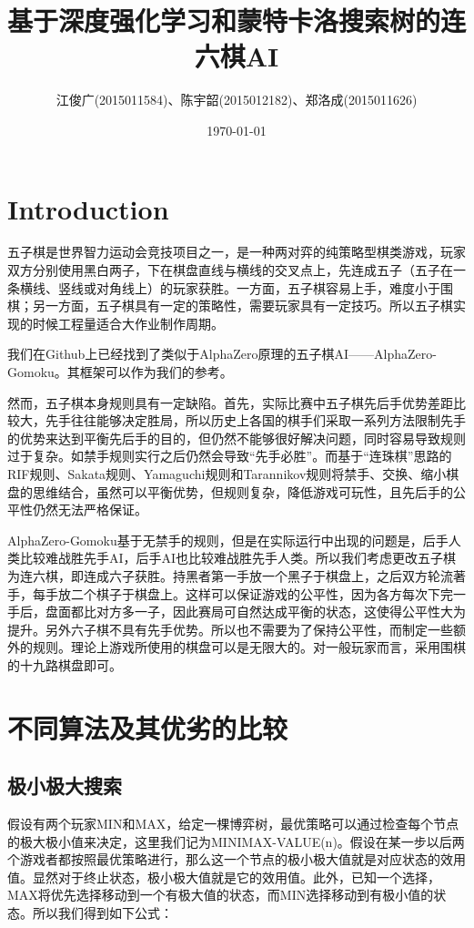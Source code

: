 \documentclass[c5size]{ctexart}
\title{基于深度强化学习和蒙特卡洛搜索树的连六棋AI}
\author{江俊广(2015011584)、陈宇韶(2015012182)、郑洛成(2015011626)}
\date{\today}
\begin{document}
	\maketitle

\section{Introduction}
	五子棋是世界智力运动会竞技项目之一，是一种两对弈的纯策略型棋类游戏，玩家双方分别使用黑白两子，下在棋盘直线与横线的交叉点上，先连成五子（五子在一条横线、竖线或对角线上）的玩家获胜。一方面，五子棋容易上手，难度小于围棋；另一方面，五子棋具有一定的策略性，需要玩家具有一定技巧。所以五子棋实现的时候工程量适合大作业制作周期。\par
	我们在Github上已经找到了类似于AlphaZero原理的五子棋AI——AlphaZero-Gomoku。其框架可以作为我们的参考。\par
	
	然而，五子棋本身规则具有一定缺陷。首先，实际比赛中五子棋先后手优势差距比较大，先手往往能够决定胜局，所以历史上各国的棋手们采取一系列方法限制先手的优势来达到平衡先后手的目的，但仍然不能够很好解决问题，同时容易导致规则过于复杂。如禁手规则实行之后仍然会导致“先手必胜”。而基于“连珠棋”思路的RIF规则、Sakata规则、Yamaguchi规则和Tarannikov规则将禁手、交换、缩小棋盘的思维结合，虽然可以平衡优势，但规则复杂，降低游戏可玩性，且先后手的公平性仍然无法严格保证。\par
	
	AlphaZero-Gomoku基于无禁手的规则，但是在实际运行中出现的问题是，后手人类比较难战胜先手AI，后手AI也比较难战胜先手人类。所以我们考虑更改五子棋为连六棋，即连成六子获胜。持黑者第一手放一个黑子于棋盘上，之后双方轮流著手，每手放二个棋子于棋盘上。这样可以保证游戏的公平性，因为各方每次下完一手后，盘面都比对方多一子，因此赛局可自然达成平衡的状态，这使得公平性大为提升。另外六子棋不具有先手优势。所以也不需要为了保持公平性，而制定一些额外的规则。理论上游戏所使用的棋盘可以是无限大的。对一般玩家而言，采用围棋的十九路棋盘即可。\par
	
\section{不同算法及其优劣的比较}
\subsection{极小极大搜索}
	假设有两个玩家MIN和MAX，给定一棵博弈树，最优策略可以通过检查每个节点的极大极小值来决定，这里我们记为MINIMAX-VALUE(n)。假设在某一步以后两个游戏者都按照最优策略进行，那么这一个节点的极小极大值就是对应状态的效用值。显然对于终止状态，极小极大值就是它的效用值。此外，已知一个选择，MAX将优先选择移动到一个有极大值的状态，而MIN选择移动到有极小值的状态。所以我们得到如下公式：
	
\end{document}
